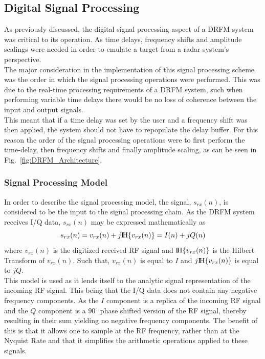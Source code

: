 	\subsection{Digital Signal Processing}
	\noindent As previously discussed, the digital signal processing aspect of a DRFM system was critical to its operation. As time delays, frequency shifts and amplitude scalings were needed in order to emulate a target from a radar system's perspective. \\ \newline The major consideration in the implementation of this signal processing scheme was the order in which the signal processing operations were performed. This was due to the real-time processing requirements of a DRFM system, such when performing variable time delays there would be no loss of coherence between the input and output signals. \\ \newline  This meant that if a time delay was set by the user and a frequency shift was then applied, the system should not have to repopulate the delay buffer. For this reason the order of the signal processing operations were to first perform the time-delay, then frequency shifts and finally amplitude scaling, as can be seen in Fig.~\ref{fig:DRFM_Architecture}.\\   \subsubsection{Signal Processing Model}In order to describe the signal processing model, the signal, $s_{rx}(n)$, is considered to be the input to the signal processing chain. As the DRFM system receives I/Q data, $s_{rx}(n)$ may be  expressed mathematically as
	\begin{equation}
		s_{rx}(n) = v_{rx}(n) +j{\rm I\!H} \{v_{rx}(n)\} = I(n) +jQ(n)
	\end{equation}
	\noindent where $v_{rx}(n)$ is the digitized received RF signal and ${\rm I\!H} \{v_{rx}(n)\}$ is the Hilbert Transform of $v_{rx}(n)$. Such that, $v_{rx}(n)$ is equal to $I$ and $j{\rm I\!H} \{v_{rx}(n)\}$ is equal to $jQ$.  \\ \newline This model is used as it lends itself to the analytic signal representation of the incoming RF signal. This being that the I/Q data does not contain any negative frequency components. As the $I$ component is a replica of the incoming RF signal and the $Q$ component is a $90^\circ$ phase shifted version of the RF signal, thereby resulting in their sum yielding no negative frequency components. The benefit of this is that it allows one to sample at the RF frequency, rather than at the Nyquist Rate and that it simplifies the arithmetic operations applied to these signals. \cite{wil} \\
